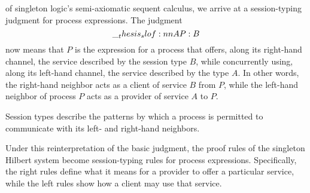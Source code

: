 
 of singleton logic's semi-axiomatic sequent calculus, we arrive at a session-typing judgment for process expressions.
The judgment
\begin{equation*}
  \slof{A |- P : B} %
\end{equation*}
now means that $P$ is the expression for a process that
offers, along its right-hand channel, the service described by the session type $B$, while concurrently using, along its left-hand channel, the service described by the type $A$.
In other words, the right-hand neighbor acts as a client of service $B$ from $P$, while the left-hand neighbor of process $P$ acts as a provider of service $A$ to $P$.

Session types describe the patterns by which a process is permitted to communicate with its left- and right-hand neighbors.

Under this reinterpretation of the basic judgment, the proof rules of the singleton Hilbert system become session-typing rules for process expressions.
Specifically, the right rules define what it means for a provider to offer a particular service, while the left rules show how a client may use that service.


